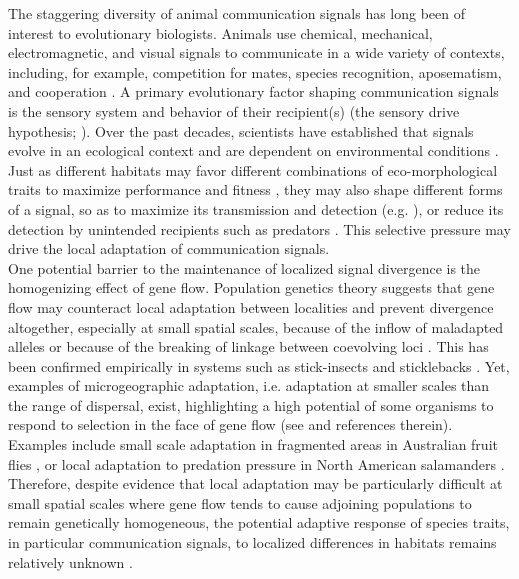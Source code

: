 
The staggering diversity of animal communication signals has long been of interest to evolutionary biologists. Animals use chemical, mechanical, electromagnetic, and visual signals to communicate in a wide variety of contexts, including, for example, competition for mates, species recognition, aposematism, and cooperation \citep{Bradbury2011}. A primary evolutionary factor shaping communication signals is the sensory system and behavior of their recipient(s) (the sensory drive hypothesis; \citealt{Endler1988,Endler1992,Endler1998}). Over the past decades, scientists have established that signals evolve in an ecological context and are dependent on environmental conditions \citep{Endler1992,Endler1993,Endler1993a}. Just as different habitats may favor different combinations of eco-morphological traits to maximize performance and fitness \citep{Arnold1983}, they may also shape different forms of a signal, so as to maximize its transmission and detection (e.g. \citealt{Seehausen1997}), or reduce its detection by unintended recipients such as predators \citep{Endler1984,Endler1990,Endler1991,Halfwerk2014}. This selective pressure may drive the local adaptation of communication signals.\\


One potential barrier to the maintenance of localized signal divergence is the homogenizing effect of gene flow. Population genetics theory suggests that gene flow may counteract local adaptation between localities and prevent divergence altogether, especially at small spatial scales, because of the inflow of maladapted alleles or because of the breaking of linkage between coevolving loci \citep{Felsenstein1976, Garcia-Ramos1997, Dieckmann1999, Lenormand2002, Hendry2007}. This has been confirmed empirically in systems such as stick-insects \citep{Nosil2004} and sticklebacks \citep{Hendry2007a}. Yet, examples of microgeographic adaptation, i.e. adaptation at smaller scales than the range of dispersal, exist, highlighting a high potential of some organisms to respond to selection in the face of gene flow (see \citealt{Richardson2014} and references therein). Examples include small scale adaptation in fragmented areas in Australian fruit flies \citep{Willi2012}, or local adaptation to predation pressure in North American salamanders \citep{Richardson2013}. Therefore, despite evidence that local adaptation may be particularly difficult at small spatial scales where gene flow tends to cause adjoining populations to remain genetically homogeneous, the potential adaptive response of species traits, in particular communication signals, to localized differences in habitats remains relatively unknown \citep{Richardson2014}.\\

